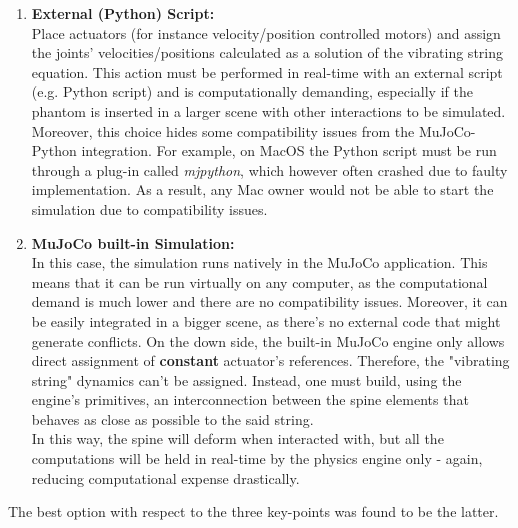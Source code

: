 \documentclass[a4paper, 12pt]{article}
\begin{document}
\begin{enumerate}
    \item \textbf{External (Python) Script:}\\
    Place actuators (for instance velocity/position controlled motors) and assign the joints' velocities/positions calculated as a solution of the vibrating string equation. This action must be performed in real-time with an external script (e.g. Python script) and is computationally demanding, especially if the phantom is inserted in a larger scene with other interactions to be simulated.\\
    Moreover, this choice hides some compatibility issues from the MuJoCo-Python integration. For example, on MacOS the Python script must be run through a plug-in called \textit{mjpython}, which however often crashed due to faulty implementation. As a result, any Mac owner would not be able to start the simulation due to compatibility issues. 
    \item \textbf{MuJoCo built-in Simulation:}\\
    In this case, the simulation runs natively in the MuJoCo application. This means that it can be run virtually on any computer, as the computational demand is much lower and there are no compatibility issues.
    Moreover, it can be easily integrated in a bigger scene, as there's no external code that might generate conflicts.
    On the down side, the built-in MuJoCo engine only allows direct assignment of \textbf{constant} actuator's references. Therefore, the "vibrating string" dynamics can't be assigned. Instead, one must build, using the engine's primitives, an interconnection between the spine elements that behaves as close as possible to the said string. 
    \\ In this way, the spine will deform when interacted with, but all the computations will be held in real-time by the physics engine only - again, reducing computational expense drastically.
\end{enumerate}
The best option with respect to the three key-points was found to be the latter.
\end{document}

